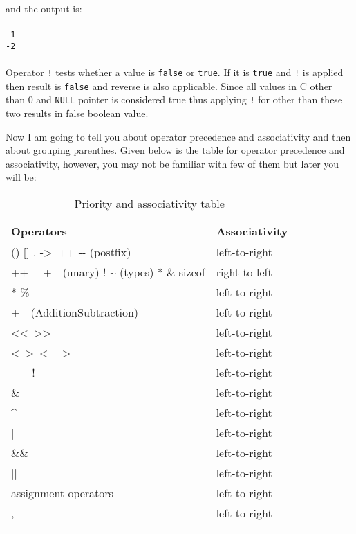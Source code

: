 and the output is:
\\\\\texttt{-1\\
-2\\\\}
Operator \texttt{!} tests whether a value is \texttt{false} or
\texttt{true}. If it is \texttt{true} and \texttt{!} is applied then result is
\texttt{false} and reverse is also applicable. Since all values in C other than
0 and \texttt{NULL} pointer is considered true thus applying \texttt{!} for
other than these two results in false boolean value.

Now I am going to tell you
about operator precedence and associativity and then about grouping
parenthes. Given below is the table for operator precedence and associativity,
however, you may not be familiar with few of them but later you will be:

\begin{center}
  \begin{longtable}{|l|l|}
    \hline
    \textbf{Operators}&\textbf{Associativity}\\\hline
    () [] . -\textgreater~++ {-}{-} (postfix) & left-to-right\\\hline
    ++ {-}{-} + - (unary) ! \~{} (types) * \& sizeof & right-to-left\\\hline
    * \/ \% & left-to-right\\\hline
    + - (Addition\/Subtraction) & left-to-right\\\hline
    \textless\textless~\textgreater\textgreater & left-to-right\\\hline
    \textless~\textgreater~\textless=~\textgreater= & left-to-right\\\hline
    == != & left-to-right\\\hline
    \& & left-to-right\\\hline
    \textasciicircum{} & left-to-right\\\hline
    | & left-to-right\\\hline
    \&\& & left-to-right\\\hline
    || & left-to-right\\\hline
    assignment operators & left-to-right\\\hline
    , & left-to-right\\\hline
    \caption{Priority and associativity table}
    \label{table:paat}
  \end{longtable}
\end{center}

